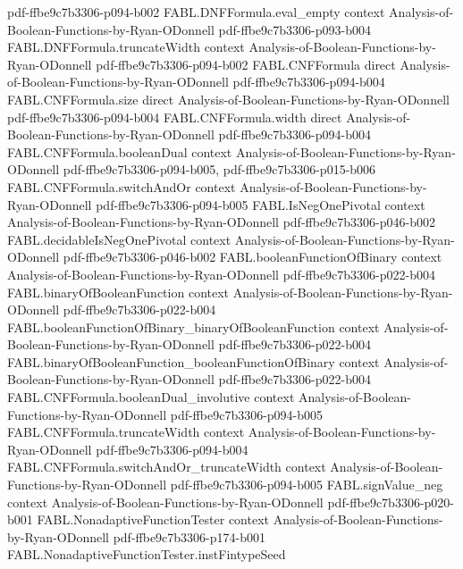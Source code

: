 \begin{theorem}
  {pdf-ffbe9c7b3306-p094-b002}
\proofstep
  {FABL.DNFFormula.eval_empty}
  {context}
  {Analysis-of-Boolean-Functions-by-Ryan-ODonnell}
  {pdf-ffbe9c7b3306-p093-b004}
\proofstep
  {FABL.DNFFormula.truncateWidth}
  {context}
  {Analysis-of-Boolean-Functions-by-Ryan-ODonnell}
  {pdf-ffbe9c7b3306-p094-b002}
\proofstep
  {FABL.CNFFormula}
  {direct}
  {Analysis-of-Boolean-Functions-by-Ryan-ODonnell}
  {pdf-ffbe9c7b3306-p094-b004}
\proofstep
  {FABL.CNFFormula.size}
  {direct}
  {Analysis-of-Boolean-Functions-by-Ryan-ODonnell}
  {pdf-ffbe9c7b3306-p094-b004}
\proofstep
  {FABL.CNFFormula.width}
  {direct}
  {Analysis-of-Boolean-Functions-by-Ryan-ODonnell}
  {pdf-ffbe9c7b3306-p094-b004}
\proofstep
  {FABL.CNFFormula.booleanDual}
  {context}
  {Analysis-of-Boolean-Functions-by-Ryan-ODonnell}
  {pdf-ffbe9c7b3306-p094-b005,
    pdf-ffbe9c7b3306-p015-b006}
\proofstep
  {FABL.CNFFormula.switchAndOr}
  {context}
  {Analysis-of-Boolean-Functions-by-Ryan-ODonnell}
  {pdf-ffbe9c7b3306-p094-b005}
\proofstep
  {FABL.IsNegOnePivotal}
  {context}
  {Analysis-of-Boolean-Functions-by-Ryan-ODonnell}
  {pdf-ffbe9c7b3306-p046-b002}
\proofstep
  {FABL.decidableIsNegOnePivotal}
  {context}
  {Analysis-of-Boolean-Functions-by-Ryan-ODonnell}
  {pdf-ffbe9c7b3306-p046-b002}
\proofstep
  {FABL.booleanFunctionOfBinary}
  {context}
  {Analysis-of-Boolean-Functions-by-Ryan-ODonnell}
  {pdf-ffbe9c7b3306-p022-b004}
\proofstep
  {FABL.binaryOfBooleanFunction}
  {context}
  {Analysis-of-Boolean-Functions-by-Ryan-ODonnell}
  {pdf-ffbe9c7b3306-p022-b004}
\proofstep
  {FABL.booleanFunctionOfBinary_binaryOfBooleanFunction}
  {context}
  {Analysis-of-Boolean-Functions-by-Ryan-ODonnell}
  {pdf-ffbe9c7b3306-p022-b004}
\proofstep
  {FABL.binaryOfBooleanFunction_booleanFunctionOfBinary}
  {context}
  {Analysis-of-Boolean-Functions-by-Ryan-ODonnell}
  {pdf-ffbe9c7b3306-p022-b004}
\proofstep
  {FABL.CNFFormula.booleanDual_involutive}
  {context}
  {Analysis-of-Boolean-Functions-by-Ryan-ODonnell}
  {pdf-ffbe9c7b3306-p094-b005}
\proofstep
  {FABL.CNFFormula.truncateWidth}
  {context}
  {Analysis-of-Boolean-Functions-by-Ryan-ODonnell}
  {pdf-ffbe9c7b3306-p094-b004}
\proofstep
  {FABL.CNFFormula.switchAndOr_truncateWidth}
  {context}
  {Analysis-of-Boolean-Functions-by-Ryan-ODonnell}
  {pdf-ffbe9c7b3306-p094-b005}
\proofstep
  {FABL.signValue_neg}
  {context}
  {Analysis-of-Boolean-Functions-by-Ryan-ODonnell}
  {pdf-ffbe9c7b3306-p020-b001}
\proofstep
  {FABL.NonadaptiveFunctionTester}
  {context}
  {Analysis-of-Boolean-Functions-by-Ryan-ODonnell}
  {pdf-ffbe9c7b3306-p174-b001}
\proofstep
  {FABL.NonadaptiveFunctionTester.instFintypeSeed}

\end{theorem}
